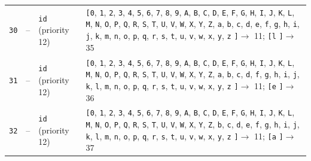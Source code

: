 \documentclass[11pt,a4paper]{article}
\newcommand{\opensymbolset}{\texttt{[}}
\newcommand{\closesymbolset}{\texttt{]}}
\begin{document}
\begin{landscape}
\begin{longtable}{
    >{\centering\arraybackslash}p{0.8cm}
    >{\centering\arraybackslash}p{0.7cm}
    >{\raggedright\arraybackslash}p{3.7cm}
    >{\raggedright\arraybackslash}p{18.1cm}
}
\texttt{30} & -- & \texttt{id} (priority 12) & \opensymbolset \texttt{0}, \texttt{1}, \texttt{2}, \texttt{3}, \texttt{4}, \texttt{5}, \texttt{6}, \texttt{7}, \texttt{8}, \texttt{9}, \texttt{A}, \texttt{B}, \texttt{C}, \texttt{D}, \texttt{E}, \texttt{F}, \texttt{G}, \texttt{H}, \texttt{I}, \texttt{J}, \texttt{K}, \texttt{L}, \texttt{M}, \texttt{N}, \texttt{O}, \texttt{P}, \texttt{Q}, \texttt{R}, \texttt{S}, \texttt{T}, \texttt{U}, \texttt{V}, \texttt{W}, \texttt{X}, \texttt{Y}, \texttt{Z}, \texttt{a}, \texttt{b}, \texttt{c}, \texttt{d}, \texttt{e}, \texttt{f}, \texttt{g}, \texttt{h}, \texttt{i}, \texttt{j}, \texttt{k}, \texttt{m}, \texttt{n}, \texttt{o}, \texttt{p}, \texttt{q}, \texttt{r}, \texttt{s}, \texttt{t}, \texttt{u}, \texttt{v}, \texttt{w}, \texttt{x}, \texttt{y}, \texttt{z} \closesymbolset $\to$ 11; \opensymbolset \texttt{l} \closesymbolset $\to$ 35 \\
\texttt{31} & -- & \texttt{id} (priority 12) & \opensymbolset \texttt{0}, \texttt{1}, \texttt{2}, \texttt{3}, \texttt{4}, \texttt{5}, \texttt{6}, \texttt{7}, \texttt{8}, \texttt{9}, \texttt{A}, \texttt{B}, \texttt{C}, \texttt{D}, \texttt{E}, \texttt{F}, \texttt{G}, \texttt{H}, \texttt{I}, \texttt{J}, \texttt{K}, \texttt{L}, \texttt{M}, \texttt{N}, \texttt{O}, \texttt{P}, \texttt{Q}, \texttt{R}, \texttt{S}, \texttt{T}, \texttt{U}, \texttt{V}, \texttt{W}, \texttt{X}, \texttt{Y}, \texttt{Z}, \texttt{a}, \texttt{b}, \texttt{c}, \texttt{d}, \texttt{f}, \texttt{g}, \texttt{h}, \texttt{i}, \texttt{j}, \texttt{k}, \texttt{l}, \texttt{m}, \texttt{n}, \texttt{o}, \texttt{p}, \texttt{q}, \texttt{r}, \texttt{s}, \texttt{t}, \texttt{u}, \texttt{v}, \texttt{w}, \texttt{x}, \texttt{y}, \texttt{z} \closesymbolset $\to$ 11; \opensymbolset \texttt{e} \closesymbolset $\to$ 36 \\
\texttt{32} & -- & \texttt{id} (priority 12) & \opensymbolset \texttt{0}, \texttt{1}, \texttt{2}, \texttt{3}, \texttt{4}, \texttt{5}, \texttt{6}, \texttt{7}, \texttt{8}, \texttt{9}, \texttt{A}, \texttt{B}, \texttt{C}, \texttt{D}, \texttt{E}, \texttt{F}, \texttt{G}, \texttt{H}, \texttt{I}, \texttt{J}, \texttt{K}, \texttt{L}, \texttt{M}, \texttt{N}, \texttt{O}, \texttt{P}, \texttt{Q}, \texttt{R}, \texttt{S}, \texttt{T}, \texttt{U}, \texttt{V}, \texttt{W}, \texttt{X}, \texttt{Y}, \texttt{Z}, \texttt{b}, \texttt{c}, \texttt{d}, \texttt{e}, \texttt{f}, \texttt{g}, \texttt{h}, \texttt{i}, \texttt{j}, \texttt{k}, \texttt{l}, \texttt{m}, \texttt{n}, \texttt{o}, \texttt{p}, \texttt{q}, \texttt{r}, \texttt{s}, \texttt{t}, \texttt{u}, \texttt{v}, \texttt{w}, \texttt{x}, \texttt{y}, \texttt{z} \closesymbolset $\to$ 11; \opensymbolset \texttt{a} \closesymbolset $\to$ 37 \\

\end{longtable}
\end{landscape}
\end{document}
